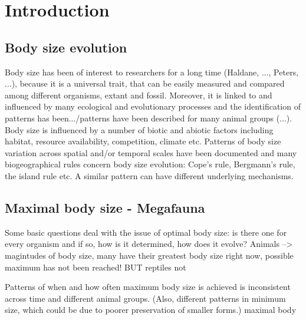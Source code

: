 \section{Introduction}
\subsection{Body size evolution}
Body size has been of interest to researchers for a long time (Haldane, ..., Peters, ...), because it is a universal trait, that can be easily measured and compared among different organisms, extant and fossil. Moreover, it is linked to and influenced by many ecological and evolutionary processes and the identification of patterns has been.../patterns have been described for many animal groups (...). Body size is influenced by a number of biotic and abiotic factors including habitat, resource availability, competition, climate etc.
Patterns of body size variation across spatial and/or temporal scales have been documented and many biogeographical rules concern body size evolution: Cope's rule, Bergmann's rule, the island rule etc.
A similar pattern can have different underlying mechanisms.


\subsection{Maximal body size - Megafauna}
Some basic questions deal with the issue of optimal body size: is there one for every organism and if so, how is it determined, how does it evolve?
Animals --> magintudes of body size, many have their greatest body size right now, possible maximum has not been reached! BUT reptiles not

Patterns of when and how often maximum body size is achieved is inconsistent across time and different animal groups.
(Also, different patterns in minimum size, which could be due to poorer preservation of smaller forms.) maximal body


